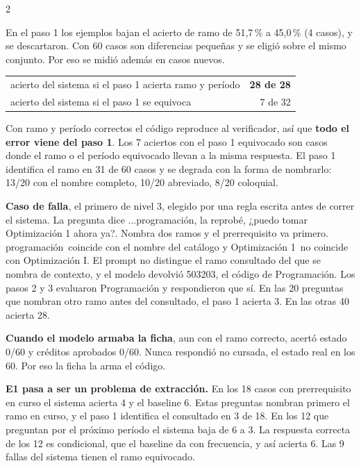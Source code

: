 \documentclass[9pt,a4paper]{extarticle}
\newcommand{\seccion}[1]{\vspace{0.9mm}{\bfseries\footnotesize\color{acento}\MakeUppercase{#1}}\par\nobreak\vspace{0.4mm}\nobreak}
\newcommand{\q}{\textquotedbl}
\begin{document}
\begin{multicols}{2}
{En el paso 1 los ejemplos bajan el acierto de ramo de 51,7\,\% a 45,0\,\% (4 casos), y se
descartaron. Con 60 casos son diferencias pequeñas y se eligió sobre el mismo conjunto. Por eso se midió además en casos nuevos.\par}

\seccion{Dónde se rompe y por qué}

\vspace{0.5mm}
{\footnotesize
\begin{tabular}{@{}lr@{}}
\toprule
acierto del sistema si el paso 1 acierta ramo y período & \textbf{28 de 28} \\
acierto del sistema si el paso 1 se equivoca & 7 de 32 \\
\bottomrule
\end{tabular}}

\vspace{1mm}
{\footnotesize
Con ramo y período correctos el código reproduce al verificador, así que \textbf{todo el error
viene del paso 1}. Los 7 aciertos con el paso 1 equivocado son casos donde el ramo o el
período equivocado llevan a la misma respuesta. El paso 1 identifica el ramo en 31 de 60 casos y se degrada con la forma de nombrarlo: 13/20 con el nombre completo, 10/20 abreviado, 8/20
coloquial.

\textbf{Caso de falla}, el primero de nivel 3, elegido por una regla escrita antes de correr
el sistema. La pregunta dice \q ...programación, la reprobé, ¿puedo tomar Optimización 1 ahora ya?\q.
Nombra dos ramos y el prerrequisito va primero. \q programación\q\ coincide con el nombre del
catálogo y \q Optimización 1\q\ no coincide con \q Optimización I\q. El prompt no distingue
el ramo consultado del que se nombra de contexto, y el modelo devolvió 503203, el código de Programación. Los pasos 2 y 3
evaluaron Programación y respondieron que sí. En las 20 preguntas
que nombran otro ramo antes del consultado, el paso 1 acierta 3. En las otras 40 acierta 28.

\textbf{Cuando el modelo armaba la ficha}, aun con el ramo correcto, acertó estado 0/60 y
créditos aprobados 0/60. Nunca respondió \q no cursada\q, el estado real en los 60. Por eso la
ficha la arma el código.\par}

\seccion{Límites declarados}

{\footnotesize
\textbf{E1 pasa a ser un problema de extracción.} En los 18 casos con prerrequisito en curso el
sistema acierta 4 y el baseline 6. Estas preguntas nombran primero el ramo en curso, y el paso 1
identifica el consultado en 3 de 18. En los 12 que preguntan por el próximo período el sistema
baja de 6 a 3. La respuesta correcta de los 12 es \q condicional\q, que el baseline da con
frecuencia, y así acierta 6. Las 9 fallas del sistema tienen el ramo equivocado.

}
\end{multicols}
\end{document}

